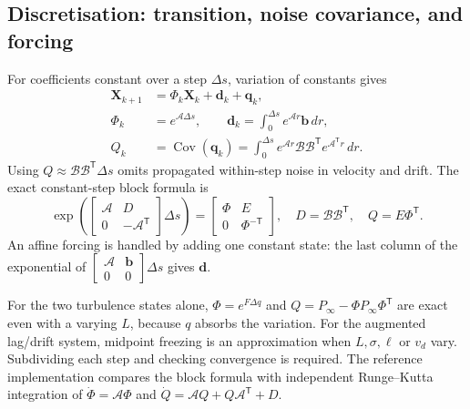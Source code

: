 \subsection{Discretisation: transition, noise covariance, and forcing}
For coefficients constant over a step $\Delta s$, variation of constants gives
\begin{align}
 \mathbf X_{k+1}&=\Phi_k\mathbf X_k+\mathbf d_k+\mathbf q_k,\\
 \Phi_k&=e^{\mathcal A\Delta s},\qquad
 \mathbf d_k=\int_0^{\Delta s}e^{\mathcal A r}\mathbf b\,dr,\\
 Q_k&=\operatorname{Cov}(\mathbf q_k)
 =\int_0^{\Delta s}e^{\mathcal A r}\mathcal B\mathcal B^{\mathsf T}e^{\mathcal A^{\mathsf T}r}\,dr.
\end{align}
Using $Q\approx\mathcal B\mathcal B^{\mathsf T}\Delta s$ omits propagated within-step noise in velocity and drift. The exact constant-step block formula is
\begin{equation}
 \exp\!\left(\begin{bmatrix}\mathcal A&D\\0&-\mathcal A^{\mathsf T}\end{bmatrix}\Delta s\right)
 =\begin{bmatrix}\Phi&E\\0&\Phi^{-\mathsf T}\end{bmatrix},
 \quad D=\mathcal B\mathcal B^{\mathsf T},\quad Q=E\Phi^{\mathsf T}.
\end{equation}
An affine forcing is handled by adding one constant state: the last column of the exponential of $\left[\begin{smallmatrix}\mathcal A&\mathbf b\\0&0\end{smallmatrix}\right]\Delta s$ gives $\mathbf d$.

For the two turbulence states alone, $\Phi=e^{F\Delta q}$ and $Q=P_\infty-\Phi P_\infty\Phi^{\mathsf T}$ are exact even with a varying $L$, because $q$ absorbs the variation. For the augmented lag/drift system, midpoint freezing is an approximation when $L,\sigma,\ell$ or $v_d$ vary. Subdividing each step and checking convergence is required. The reference implementation compares the block formula with independent Runge--Kutta integration of $\dot\Phi=\mathcal A\Phi$ and $\dot Q=\mathcal A Q+Q\mathcal A^{\mathsf T}+D$.

